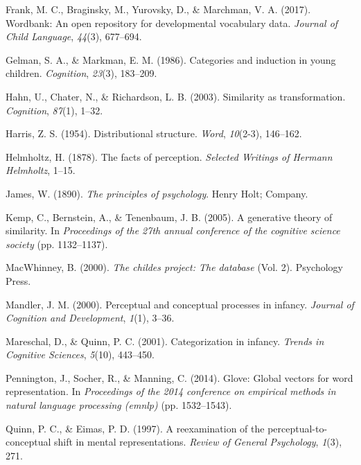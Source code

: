 \documentclass[10pt, letterpaper]{article}
\begin{document}
\hypertarget{ref-frank2017wordbank}{}
Frank, M. C., Braginsky, M., Yurovsky, D., \& Marchman, V. A. (2017).
Wordbank: An open repository for developmental vocabulary data.
\emph{Journal of Child Language}, \emph{44}(3), 677--694.

\hypertarget{ref-gelman1986categories}{}
Gelman, S. A., \& Markman, E. M. (1986). Categories and induction in
young children. \emph{Cognition}, \emph{23}(3), 183--209.

\hypertarget{ref-hahn2003similarity}{}
Hahn, U., Chater, N., \& Richardson, L. B. (2003). Similarity as
transformation. \emph{Cognition}, \emph{87}(1), 1--32.

\hypertarget{ref-harris1954distributional}{}
Harris, Z. S. (1954). Distributional structure. \emph{Word},
\emph{10}(2-3), 146--162.

\hypertarget{ref-helmholtz1878facts}{}
Helmholtz, H. (1878). The facts of perception. \emph{Selected Writings
of Hermann Helmholtz}, 1--15.

\hypertarget{ref-james2013principles}{}
James, W. (1890). \emph{The principles of psychology}. Henry Holt;
Company.

\hypertarget{ref-kemp2005generative}{}
Kemp, C., Bernstein, A., \& Tenenbaum, J. B. (2005). A generative theory
of similarity. In \emph{Proceedings of the 27th annual conference of the
cognitive science society} (pp. 1132--1137).

\hypertarget{ref-macwhinney2000childes}{}
MacWhinney, B. (2000). \emph{The childes project: The database} (Vol.
2). Psychology Press.

\hypertarget{ref-mandler2000perceptual}{}
Mandler, J. M. (2000). Perceptual and conceptual processes in infancy.
\emph{Journal of Cognition and Development}, \emph{1}(1), 3--36.

\hypertarget{ref-mareschal2001categorization}{}
Mareschal, D., \& Quinn, P. C. (2001). Categorization in infancy.
\emph{Trends in Cognitive Sciences}, \emph{5}(10), 443--450.

\hypertarget{ref-pennington2014glove}{}
Pennington, J., Socher, R., \& Manning, C. (2014). Glove: Global vectors
for word representation. In \emph{Proceedings of the 2014 conference on
empirical methods in natural language processing (emnlp)} (pp.
1532--1543).

\hypertarget{ref-quinn1997reexamination}{}
Quinn, P. C., \& Eimas, P. D. (1997). A reexamination of the
perceptual-to-conceptual shift in mental representations. \emph{Review
of General Psychology}, \emph{1}(3), 271.
\end{document}
